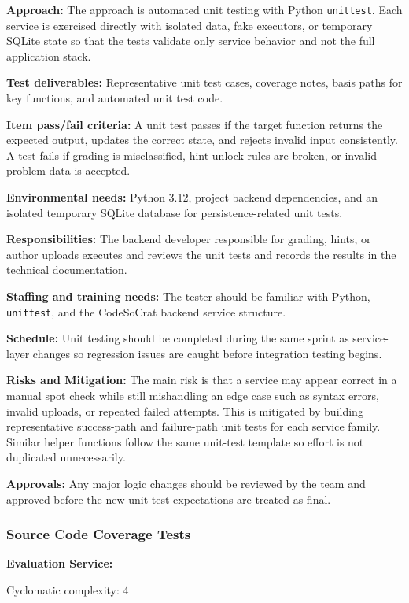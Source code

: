 \textbf{Approach:}
The approach is automated unit testing with Python \texttt{unittest}. Each service is exercised directly with isolated data, fake executors, or temporary SQLite state so that the tests validate only service behavior and not the full application stack.

\textbf{Test deliverables:}
Representative unit test cases, coverage notes, basis paths for key functions, and automated unit test code.

\textbf{Item pass/fail criteria:}
A unit test passes if the target function returns the expected output, updates the correct state, and rejects invalid input consistently. A test fails if grading is misclassified, hint unlock rules are broken, or invalid problem data is accepted.

\textbf{Environmental needs:}
Python 3.12, project backend dependencies, and an isolated temporary SQLite database for persistence-related unit tests.

\textbf{Responsibilities:}
The backend developer responsible for grading, hints, or author uploads executes and reviews the unit tests and records the results in the technical documentation.

\textbf{Staffing and training needs:}
The tester should be familiar with Python, \texttt{unittest}, and the CodeSoCrat backend service structure.

\textbf{Schedule:}
Unit testing should be completed during the same sprint as service-layer changes so regression issues are caught before integration testing begins.

\textbf{Risks and Mitigation:}
The main risk is that a service may appear correct in a manual spot check while still mishandling an edge case such as syntax errors, invalid uploads, or repeated failed attempts. This is mitigated by building representative success-path and failure-path unit tests for each service family. Similar helper functions follow the same unit-test template so effort is not duplicated unnecessarily.

\textbf{Approvals:}
Any major logic changes should be reviewed by the team and approved before the new unit-test expectations are treated as final.

\subsubsection{Source Code Coverage Tests}
\textbf{Evaluation Service:}

Cyclomatic complexity: 4

